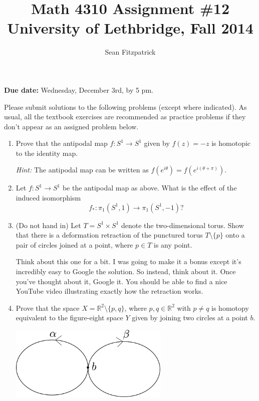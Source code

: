 \documentclass[letterpaper,12pt]{article}
\title{Math 4310 Assignment \#12\\University of Lethbridge, Fall 2014}
\author{Sean Fitzpatrick}
\newcommand{\R}{\mathbb{R}}
\begin{document}
 \maketitle

{\bf Due date:} Wednesday, December 3rd, by 5 pm.

\bigskip

Please submit solutions to the following problems (except where indicated). As usual, all the textbook exercises are recommended as practice problems if they don't appear as an assigned problem below.

\begin{enumerate}
\item Prove that the antipodal map $f:S^1\to S^1$ given by $f(z)=-z$ is homotopic to the identity map.

{\em Hint:} The antipodal map can be written as $f(e^{i\theta}) = f(e^{i(\theta+\pi)})$.

\item Let $f:S^1\to S^1$ be the antipodal map as above. What is the effect of the induced isomorphism
\[
f_*:\pi_1(S^1,1)\to \pi_1(S^1,-1)?
\]
\item (Do not hand in) Let $T = S^1\times S^1$ denote the two-dimensional torus. Show that there is a deformation retraction of the punctured torus $T\setminus\{p\}$ onto a pair of circles joined at a point, where $p\in T$ is any point.

Think about this one for a bit. I was going to make it a bonus except it's incredibly easy to Google the solution. So instead, think about it. Once you've thought about it, Google it. You should be able to find a nice YouTube video illustrating exactly how the retraction works.

\item Prove that the space $X = \R^2\setminus \{p,q\}$, where $p,q\in\R^2$ with $p\neq q$ is homotopy equivalent to the figure-eight space $Y$ given by joining two circles at a point $b$.
\begin{center}
\includegraphics[width=3in]{figure8.pdf}
\end{center}

\end{enumerate}
\end{document}
